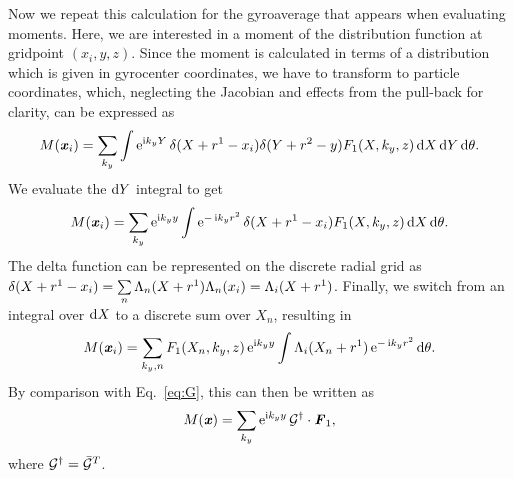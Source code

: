 \documentclass[12pt]{article}
\begin{document}
Now we repeat this calculation for the gyroaverage that appears when 
evaluating moments. Here, we are interested in a moment of the distribution
function at gridpoint $(x_i,y,z)$.
Since the moment is calculated in terms of a distribution which is given in
gyrocenter coordinates, we have to transform to particle coordinates, which, 
neglecting the Jacobian and effects from the pull-back for clarity, can be 
expressed as
\begin{align}
M(\textbf{\textit{x}}_i)=\sum\limits_{k_y}\int\operatorname{e}^{\operatorname{i}\! k_yY}\delta(X+r^1-x_i)\delta(Y+r^2-y)
F_1(X,k_y,z)\operatorname{d}\! X\operatorname{d}\! Y\operatorname{d}\!\theta.
\end{align} 
We evaluate the $\operatorname{d}\! Y$ integral to get
\begin{align}
M(\textbf{\textit{x}}_i)=\sum\limits_{k_y}\operatorname{e}^{\operatorname{i}\! k_yy}\int\operatorname{e}^{-\operatorname{i}\! k_yr^2}\delta(X+r^1-x_i)F_1(X,k_y,z)\operatorname{d}\! X\operatorname{d}\!\theta.
\end{align}
The delta function can be represented on the discrete radial grid as
$\delta(X+r^1-x_i)=\sum\limits_n\Lambda_n(X+r^1)\Lambda_n(x_i)=\Lambda_i(X+r^1)$.
Finally, we switch from an integral over $\operatorname{d}\! X$ to a discrete sum over 
$X_n$, resulting in
\begin{align}
M(\textbf{\textit{x}}_i)=\sum\limits_{k_y,n}F_1(X_n,k_y,z)\operatorname{e}^{\operatorname{i}\! k_yy}\int\Lambda_i(X_n+r^1)\operatorname{e}^{-\operatorname{i}\! k_yr^2}\operatorname{d}\!\theta.
\end{align}
By comparison with Eq.~\ref{eq:G}, this can then be written as
\begin{align}
M(\textbf{\textit{x}})=\sum\limits_{k_y}\operatorname{e}^{\operatorname{i}\! k_yy}\mathcal{G}^\dag\cdot\textbf{\textit{F}}_1,
\end{align}
where $\mathcal{G}^\dag=\bar{\mathcal{G}}^T$.
\end{document}
